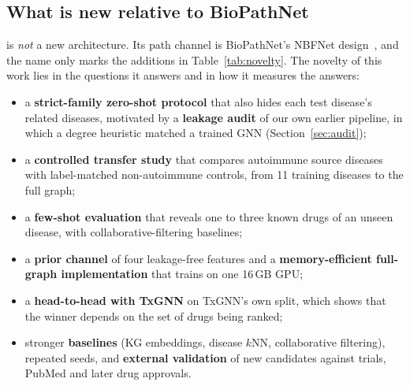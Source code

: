 \documentclass[journal]{IEEEtran}
\begin{document}
\subsection{What is new relative to BioPathNet}
\label{sec:novelty}
\sysname is \emph{not} a new architecture. Its path channel is BioPathNet's NBFNet design~\cite{hu2026biopathnet,zhu2021nbfnet}, and the name only marks the additions in Table~\ref{tab:novelty}. The novelty of this work lies in the questions it answers and in how it measures the answers:
\begin{itemize}
\item a \textbf{strict-family zero-shot protocol} that also hides each test disease's related diseases, motivated by a \textbf{leakage audit} of our own earlier pipeline, in which a degree heuristic matched a trained GNN (Section~\ref{sec:audit});
\item a \textbf{controlled transfer study} that compares autoimmune source diseases with label-matched non-autoimmune controls, from 11 training diseases to the full graph;
\item a \textbf{few-shot evaluation} that reveals one to three known drugs of an unseen disease, with collaborative-filtering baselines;
\item a \textbf{prior channel} of four leakage-free features and a \textbf{memory-efficient full-graph implementation} that trains on one 16\,GB GPU;
\item a \textbf{head-to-head with TxGNN} on TxGNN's own split, which shows that the winner depends on the set of drugs being ranked;
\item stronger \textbf{baselines} (KG embeddings, disease $k$NN, collaborative filtering), repeated seeds, and \textbf{external validation} of new candidates against trials, PubMed and later drug approvals.
\end{itemize}
\end{document}
